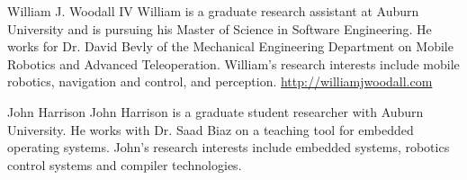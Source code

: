 \documentclass[journal]{IEEEtran}
\begin{document}
  \begin{IEEEbiography}{William J. Woodall IV}
  William is a graduate research assistant at Auburn University and is 
  pursuing his Master of Science in Software Engineering.  He works for Dr. 
  David Bevly of the Mechanical Engineering Department on Mobile Robotics and 
  Advanced Teleoperation.  William's research interests include mobile 
  robotics, navigation and control, and perception.  \url{http://williamjwoodall.com}
  \end{IEEEbiography}
  
  \begin{IEEEbiography}{John Harrison}
  John Harrison is a graduate student researcher with Auburn University. He 
  works with Dr. Saad Biaz on a teaching tool for embedded operating systems. 
  John's research interests include embedded systems, robotics control systems 
  and compiler technologies.
  \end{IEEEbiography}
  
\end{document}
